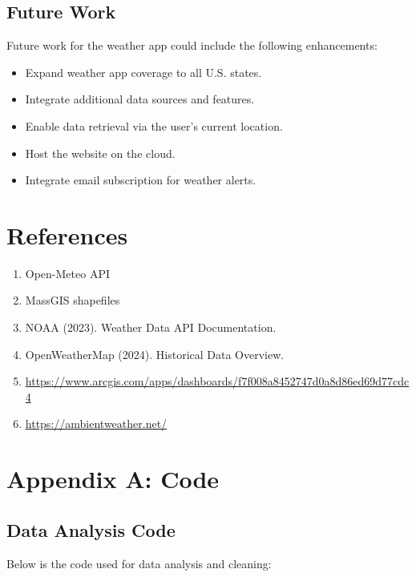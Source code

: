 \documentclass[a4paper, 12pt]{article}
\begin{document}
\subsection{Future Work}
\label{sec:future-work}
Future work for the weather app could include the following enhancements:
\begin{itemize}
    \item Expand weather app coverage to all U.S. states.
    \item Integrate additional data sources and features.
    \item Enable data retrieval via the user’s current location.
    \item Host the website on the cloud.
    \item Integrate email subscription for weather alerts.
\end{itemize}

\section{References}
\label{sec:references}

\begin{enumerate}
    \item Open-Meteo API
    \item MassGIS shapefiles
    \item NOAA (2023). Weather Data API Documentation.
    \item OpenWeatherMap (2024). Historical Data Overview.
    \item \url{https://www.arcgis.com/apps/dashboards/f7f008a8452747d0a8d86ed69d77cdc4}
    \item \url{https://ambientweather.net/}
\end{enumerate}

\appendix
\section{Appendix A: Code}
\label{sec:appendix-a}

\subsection{Data Analysis Code}
\label{sec:appendix-a1}

Below is the code used for data analysis and cleaning:
\end{document}
